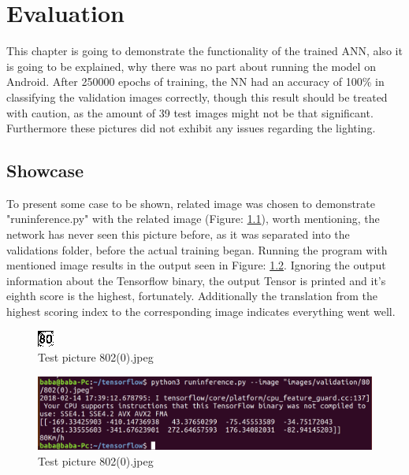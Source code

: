 
\chapter{Evaluation}\label{chapter:Evaluation}
This chapter is going to demonstrate the functionality of the trained ANN, also it is going to be explained, why there was no part about running the model on Android. After 250000 epochs of training, the NN had an accuracy of 100\% in classifying the validation images correctly, though this result should be treated with caution, as the amount of 39 test images might not be that significant. Furthermore these pictures did not exhibit any issues regarding the lighting. 

\section{Showcase}\label{sec:showcase}
To present some case to be shown, related image was chosen to demonstrate "runinference.py" with the related image (Figure: \ref{fig:802}), worth mentioning, the network has never seen this picture before, as it was separated into the validations folder, before the actual training began. Running the program with mentioned image results in the output seen in Figure: \ref{fig:programout}. Ignoring the output information about the Tensorflow binary, the output Tensor is printed and it's eighth score is the highest, fortunately. Additionally the translation from the highest scoring index to the corresponding image indicates everything went well. 

\begin{figure}[H]
	\centering
	\includegraphics[width=0.4\linewidth]{images/802(0).jpeg}
	\caption{Test picture 802(0).jpeg}\label{fig:802}
\end{figure}


\begin{figure}[H]
	\centering
	\includegraphics[width=\linewidth]{images/program.png}
	\caption{Test picture 802(0).jpeg}\label{fig:programout}
\end{figure}


